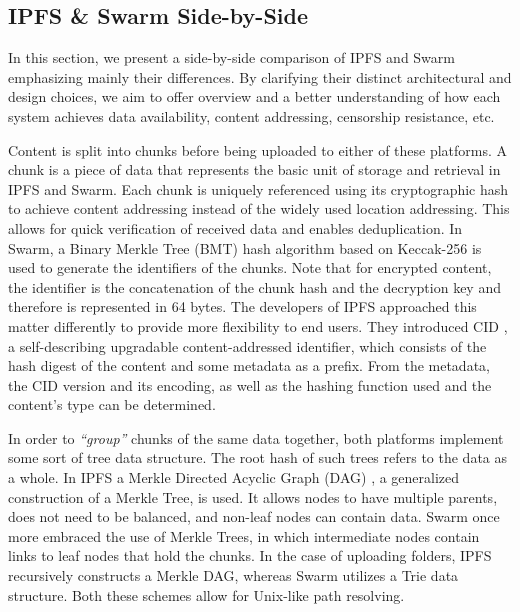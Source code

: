 \subsection{IPFS \& Swarm Side-by-Side}\label{sec:ipfs_vs_swarm}
In this section, we present a side-by-side comparison of IPFS and Swarm emphasizing mainly their differences. By clarifying their distinct architectural and design choices, we aim to offer  overview and a better understanding of how each system achieves data availability, content addressing, censorship resistance, etc.

Content is split into chunks before being uploaded to either of these platforms. A chunk is a piece of data that represents the basic unit of storage and retrieval in IPFS and Swarm. Each chunk is uniquely referenced using its cryptographic hash to achieve content addressing instead of the widely used location addressing. This allows for quick verification of received data and enables deduplication. In Swarm, a Binary Merkle Tree (BMT)  \citep{tron_2020} hash algorithm based on Keccak-256 is used to generate the identifiers of the chunks. Note that for encrypted content, the identifier is the concatenation of the chunk hash and the decryption key and therefore is represented in 64 bytes. The developers of IPFS approached this matter differently to provide more flexibility to end users. They introduced CID  \citep{multiformat}, a self-describing upgradable content-addressed identifier, which consists of the hash digest of the content and some metadata as a prefix. From the metadata, the CID version and its encoding, as well as the hashing function used and the content’s type can be determined.

In order to \emph{``group''} chunks of the same data together, both platforms implement some sort of tree data structure. The root hash of such trees refers to the data as a whole. In IPFS a Merkle Directed Acyclic Graph (DAG)  \citep{benet_2014}, a generalized construction of a Merkle Tree, is used. It allows nodes to have multiple parents, does not need to be balanced, and non-leaf nodes can contain data. Swarm once more embraced the use of Merkle Trees, in which intermediate nodes contain links to leaf nodes that hold the chunks. In the case of uploading folders, IPFS recursively constructs a Merkle DAG, whereas Swarm utilizes a Trie  \citep{tron_2020} data structure. Both these schemes allow for Unix-like path resolving.


